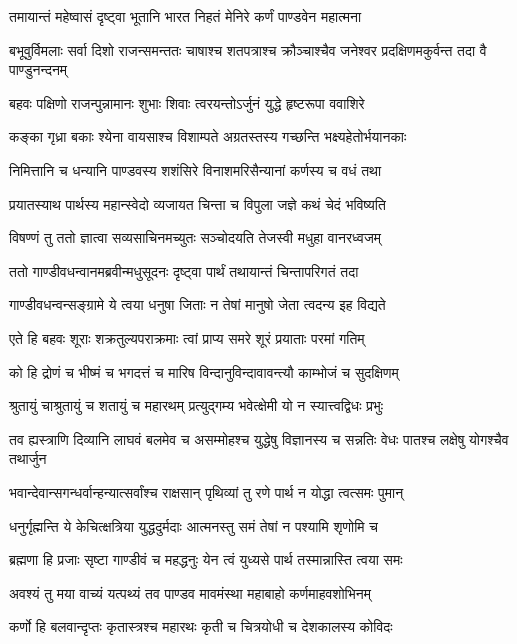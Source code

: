 \twolineshloka
{तमायान्तं महेष्वासं दृष्ट्वा भूतानि भारत}
{निहतं मेनिरे कर्णं पाण्डवेन महात्मना}


\threelineshloka
{बभूवुर्विमलाः सर्वा दिशो राजन्समन्ततः}
{चाषाश्च शतपत्राश्च क्रौञ्चाश्चैव जनेश्वर}
{प्रदक्षिणमकुर्वन्त तदा वै पाण्डुनन्दनम्}


\twolineshloka
{बहवः पक्षिणो राजन्पुन्नामानः शुभाः शिवाः}
{त्वरयन्तोऽर्जुनं युद्धे हृष्टरूपा ववाशिरे}


\twolineshloka
{कङ्का गृध्रा बकाः श्येना वायसाश्च विशाम्पते}
{अग्रतस्तस्य गच्छन्ति भक्ष्यहेतोर्भयानकाः}


\twolineshloka
{निमित्तानि च धन्यानि पाण्डवस्य शशंसिरे}
{विनाशमरिसैन्यानां कर्णस्य च वधं तथा}


\twolineshloka
{प्रयातस्याथ पार्थस्य महान्स्वेदो व्यजायत}
{चिन्ता च विपुला जज्ञे कथं चेदं भविष्यति}


\twolineshloka
{विषण्णं तु ततो ज्ञात्वा सव्यसाचिनमच्युतः}
{सञ्चोदयति तेजस्वी मधुहा वानरध्वजम्}


\twolineshloka
{ततो गाण्डीवधन्वानमब्रवीन्मधुसूदनः}
{दृष्ट्वा पार्थं तथायान्तं चिन्तापरिगतं तदा}


\twolineshloka
{गाण्डीवधन्वन्सङ्ग्रामे ये त्वया धनुषा जिताः}
{न तेषां मानुषो जेता त्वदन्य इह विद्यते}


\twolineshloka
{एते हि बहवः शूराः शक्रतुल्यपराक्रमाः}
{त्वां प्राप्य समरे शूरं प्रयाताः परमां गतिम्}


\twolineshloka
{को हि द्रोणं च भीष्मं च भगदत्तं च मारिष}
{विन्दानुविन्दावावन्त्यौ काम्भोजं च सुदक्षिणम्}


\twolineshloka
{श्रुतायुं चाश्रुतायुं च शतायुं च महारथम्}
{प्रत्युद्गम्य भवेत्क्षेमी यो न स्यात्त्वद्विधः प्रभुः}


\threelineshloka
{तव ह्यस्त्राणि दिव्यानि लाघवं बलमेव च}
{असम्मोहश्च युद्धेषु विज्ञानस्य च सन्नतिः}
{वेधः पातश्च लक्षेषु योगश्चैव तथार्जुन}


\twolineshloka
{भवान्देवान्सगन्धर्वान्हन्यात्सर्वांश्च राक्षसान्}
{पृथिव्यां तु रणे पार्थ न योद्धा त्वत्समः पुमान्}


\twolineshloka
{धनुर्गृह्मन्ति ये केचित्क्षत्रिया युद्धदुर्मदाः}
{आत्मनस्तु समं तेषां न पश्यामि शृणोमि च}


\twolineshloka
{ब्रह्मणा हि प्रजाः सृष्टा गाण्डीवं च महद्धनुः}
{येन त्वं युध्यसे पार्थ तस्मान्नास्ति त्वया समः}


\twolineshloka
{अवश्यं तु मया वाच्यं यत्पथ्यं तव पाण्डव}
{मावमंस्था महाबाहो कर्णमाहवशोभिनम्}


\twolineshloka
{कर्णो हि बलवान्दृप्तः कृतास्त्रश्च महारथः}
{कृती च चित्रयोधी च देशकालस्य कोविदः}


